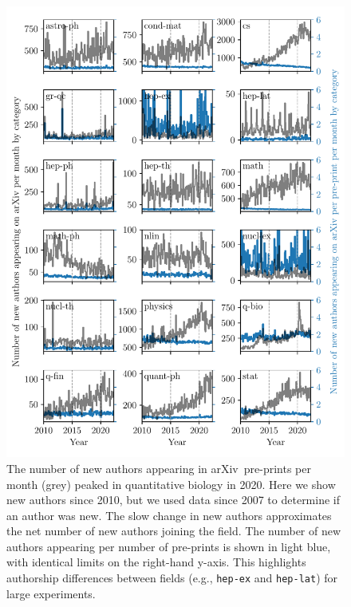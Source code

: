\documentclass[]{rsos}%
\newcommand{\arxiv}{arXiv}
\begin{document}
\begin{figure}[!h]
\begin{center}
	\includegraphics[width=0.95\linewidth]{new-authors-segmented-by-field-combined}
\end{center}
\caption{The number of new authors appearing in \arxiv\ pre-prints per month (grey) peaked in quantitative biology in 2020. Here we show new authors since 2010, but we used data since 2007 to determine if an author was new. The slow change in new authors  approximates the net number of new authors joining the field. The number of new authors appearing per number of pre-prints is shown in light blue, with identical limits on the right-hand y-axis. This highlights authorship differences between fields (e.g., \texttt{hep-ex} and \texttt{hep-lat}) for large experiments.}
\label{fig:3}
\end{figure}
\end{document}
